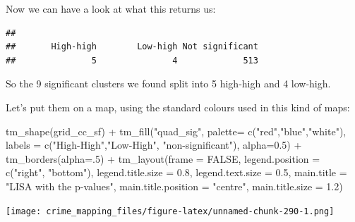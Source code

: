 \documentclass[
  krantz2]{krantz}
\makeatletter
\newenvironment{Shaded}{\begin{snugshade}}{\end{snugshade}}
\newcommand{\AttributeTok}[1]{\textcolor[rgb]{0.61,0.61,0.61}{#1}}
\newcommand{\ConstantTok}[1]{\textcolor[rgb]{0,0,0}{#1}}
\newcommand{\DecValTok}[1]{\textcolor[rgb]{0.06,0.06,0.06}{#1}}
\newcommand{\FloatTok}[1]{\textcolor[rgb]{0.06,0.06,0.06}{#1}}
\newcommand{\FunctionTok}[1]{\textcolor[rgb]{0,0,0}{#1}}
\newcommand{\NormalTok}[1]{#1}
\newcommand{\SpecialCharTok}[1]{\textcolor[rgb]{0,0,0}{#1}}
\newcommand{\StringTok}[1]{\textcolor[rgb]{0.5,0.5,0.5}{#1}}
\newenvironment{kframe}{%
\medskip{}
\setlength{\fboxsep}{.8em}
 \def\at@end@of@kframe{}%
 \ifinner\ifhmode%
  \def\at@end@of@kframe{\end{minipage}}%
  \begin{minipage}{\columnwidth}%
 \fi\fi%
 \def\FrameCommand##1{\hskip\@totalleftmargin \hskip-\fboxsep
 \colorbox{shadecolor}{##1}\hskip-\fboxsep
     \hskip-\linewidth \hskip-\@totalleftmargin \hskip\columnwidth}%
 \MakeFramed {\advance\hsize-\width
   \@totalleftmargin\z@ \linewidth\hsize
   \@setminipage}}%
 {\par\unskip\endMakeFramed%
 \at@end@of@kframe}
\renewenvironment{Shaded}{\begin{kframe}}{\end{kframe}}
\makeatother
\begin{document}
Now we can have a look at what this returns us:

\begin{Shaded}
\end{Shaded}

\begin{verbatim}
## 
##       High-high        Low-high Not significant 
##               5               4             513
\end{verbatim}

So the 9 significant clusters we found split into 5 high-high and 4 low-high.

Let's put them on a map, using the standard colours used in this kind of maps:

\begin{Shaded}
\begin{Highlighting}[]
\FunctionTok{tm\_shape}\NormalTok{(grid\_cc\_sf) }\SpecialCharTok{+} 
  \FunctionTok{tm\_fill}\NormalTok{(}\StringTok{"quad\_sig"}\NormalTok{,}
          \AttributeTok{palette=} \FunctionTok{c}\NormalTok{(}\StringTok{"red"}\NormalTok{,}\StringTok{"blue"}\NormalTok{,}\StringTok{"white"}\NormalTok{),}
          \AttributeTok{labels =} \FunctionTok{c}\NormalTok{(}\StringTok{"High{-}High"}\NormalTok{,}\StringTok{"Low{-}High"}\NormalTok{, }\StringTok{"non{-}significant"}\NormalTok{),}
          \AttributeTok{alpha=}\FloatTok{0.5}\NormalTok{) }\SpecialCharTok{+}
  \FunctionTok{tm\_borders}\NormalTok{(}\AttributeTok{alpha=}\NormalTok{.}\DecValTok{5}\NormalTok{) }\SpecialCharTok{+}
  \FunctionTok{tm\_layout}\NormalTok{(}\AttributeTok{frame =} \ConstantTok{FALSE}\NormalTok{,}
            \AttributeTok{legend.position =} \FunctionTok{c}\NormalTok{(}\StringTok{"right"}\NormalTok{, }\StringTok{"bottom"}\NormalTok{), }
            \AttributeTok{legend.title.size =} \FloatTok{0.8}\NormalTok{,}
            \AttributeTok{legend.text.size =} \FloatTok{0.5}\NormalTok{,}
            \AttributeTok{main.title =} \StringTok{"LISA with the p{-}values"}\NormalTok{,}
            \AttributeTok{main.title.position =} \StringTok{"centre"}\NormalTok{,}
            \AttributeTok{main.title.size =} \FloatTok{1.2}\NormalTok{)}
\end{Highlighting}
\end{Shaded}

\texttt{[image: crime\_mapping\_files/figure-latex/unnamed-chunk-290-1.png]}
\end{document}
